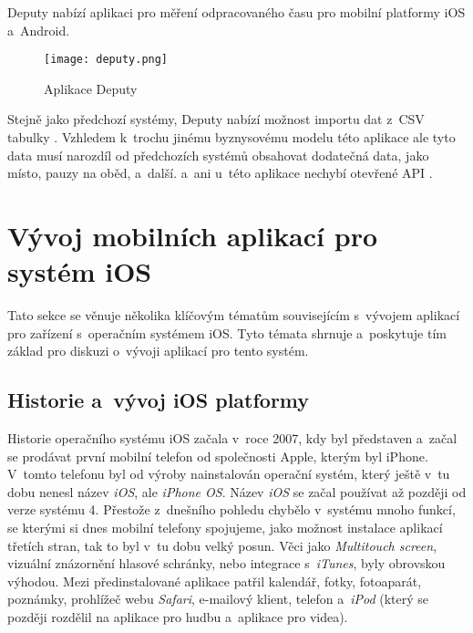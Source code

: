 Deputy nabízí aplikaci pro měření odpracovaného času pro mobilní platformy iOS a~Android. 

\begin{figure}[h]
	\centering
	\texttt{[image: deputy.png]}
	\caption{Aplikace Deputy \cite{deputy-time-tracking-app}}
\end{figure}

Stejně jako předchozí systémy, Deputy nabízí možnost importu dat z~CSV tabulky \cite{deputy-import-csv}. Vzhledem k~trochu jinému byznysovému modelu této aplikace ale tyto data musí narozdíl od předchozích systémů obsahovat dodatečná data, jako místo, pauzy na oběd, a~další. a~ani u~této aplikace nechybí otevřené API \cite{deputy-api}.

\section{Vývoj mobilních aplikací pro systém iOS}

Tato sekce se věnuje několika klíčovým tématům souvisejícím s~vývojem aplikací pro zařízení s~operačním systémem iOS. Tyto témata shrnuje a~poskytuje tím základ pro diskuzi o~vývoji aplikací pro tento systém.

\subsection{Historie a~vývoj iOS platformy}

Historie operačního systému iOS začala v~roce 2007, kdy byl představen a~začal se prodávat první mobilní telefon od společnosti Apple, kterým byl iPhone. V~tomto telefonu byl od výroby nainstalován operační systém, který ještě v~tu dobu nenesl název \emph{iOS}, ale \emph{iPhone OS}. Název \emph{iOS} se začal používat až později od verze systému 4. Přestože z~dnešního pohledu chybělo v~systému mnoho funkcí, se kterými si dnes mobilní telefony spojujeme, jako možnost instalace aplikací třetích stran, tak to byl v~tu dobu velký posun. Věci jako \emph{Multitouch screen}, vizuální znázornění hlasové schránky, nebo integrace s~\emph{iTunes}, byly obrovskou výhodou. Mezi předinstalované aplikace patřil kalendář, fotky, fotoaparát, poznámky, prohlížeč webu \emph{Safari}, e-mailový klient, telefon a~\emph{iPod} (který se později rozdělil na aplikace pro hudbu a~aplikace pro videa).

